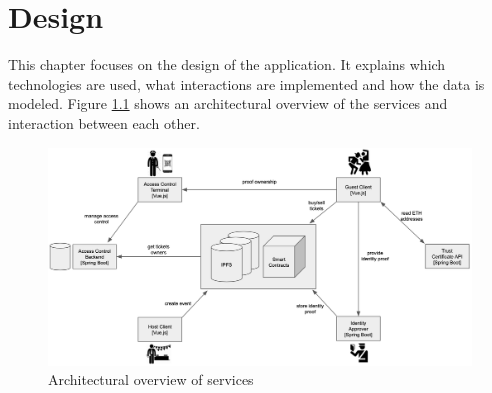 \chapter{Design}\label{chapter:design}
This chapter focuses on the design of the application. It explains which technologies are used, what interactions are implemented and how the data is modeled. Figure \ref{fig:architecutral-overview} shows an architectural overview of the services and interaction between each other. 


\begin{figure}[H]
    \centering
    \includegraphics[width=16cm]{figures/architecutal-overview.png}
    \caption{Architectural overview of services}
    \label{fig:architecutral-overview}
\end{figure}













